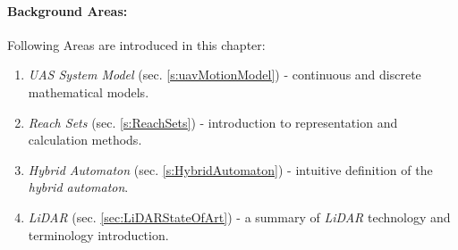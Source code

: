 \paragraph{Background Areas:} Following Areas are introduced in this chapter:
\begin{enumerate}
    \item \emph{UAS System Model} (sec. \ref{s:uavMotionModel}) - continuous and discrete mathematical models.
    
    \item \emph{Reach Sets} (sec. \ref{s:ReachSets}) - introduction to representation and calculation methods.
    
    \item \emph{Hybrid Automaton} (sec. \ref{s:HybridAutomaton}) - intuitive definition  of the \emph{hybrid automaton}.
    
    \item \emph{LiDAR} (sec. \ref{sec:LiDARStateOfArt}) - a summary of \emph{LiDAR} technology and terminology introduction.
\end{enumerate}

